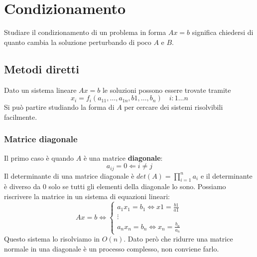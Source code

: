 \newpage
\section{Condizionamento}
Studiare il condizionamento di un problema in forma $Ax=b$ significa chiedersi di quanto cambia la soluzione perturbando di poco $A$ e $B$.
\subsection{Metodi diretti}
Dato un sistema lineare $Ax=b$ le soluzioni possono essere trovate tramite
\begin{equation*}
	x_i = f_i(a_{11}, \ldots, a_{1n}, b1, \ldots, b_n) \quad i:1\ldots n
\end{equation*}
Si può partire studiando la forma di $A$ per cercare dei sistemi risolvibili facilmente.
\subsubsection{Matrice diagonale}
Il primo caso è quando $A$ è una matrice \textbf{diagonale}:
\begin{equation*}
	a_{ij}=0 \Longleftarrow i \neq j 
\end{equation*}
Il determinante di una matrice diagonale è $det(A)=\prod_{i=1}^{n} a_i$ e il determinante è diverso da $0$ solo se tutti gli elementi della diagonale lo sono.
Possiamo riscrivere la matrice in un sistema di equazioni lineari:
\begin{equation*}
	Ax=b \Leftrightarrow \left\{ \begin{array}{lr}
		a_1x_1 = b_1 \Leftrightarrow x1 = \frac{b1}{a1}\\
		\vdots\\
		a_nx_n = b_n \Leftrightarrow x_n=\frac{b_n}{a_n}
	\end{array} \right.
\end{equation*}
Questo sistema lo risolviamo in $O(n)$. Dato però che ridurre una matrice normale in una diagonale è un processo complesso, non conviene farlo.
